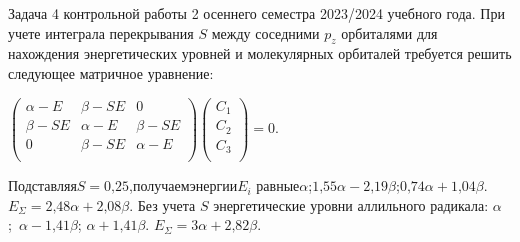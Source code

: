 \vspace{-\parskip}
\par
{} Задача 4 контрольной работы 2 осеннего семестра 2023/2024 учебного года. При учете интеграла перекрывания $S$ между соседними $p_z$ орбиталями для нахождения энергетических уровней и молекулярных орбиталей требуется решить следующее матричное уравнение:\par
\vspace{-\parskip}
\vspace{2mm}
\hspace{7mm}
$\begin{pmatrix}
\alpha-E & \beta-SE & 0 \\
\beta-SE & \alpha-E & \beta-SE \\
0 & \beta-SE & \alpha-E \\
\end{pmatrix}
\begin{pmatrix}
C_1 \\
C_2 \\
C_3 \\
\end{pmatrix}=0.$\par
\vspace{-\parskip}
\vspace{2mm}
Подставляя\hspace{\fill}$S=0\text{,}25$,\hspace{\fill}получаем\hspace{\fill}энергии\hspace{\fill}$E_i$ равные\hspace{\fill}$\alpha$;\hspace{\fill}$1\text{,}55\alpha-2\text{,}19\beta$;\hspace{\fill}$0\text{,}74\alpha+1\text{,}04\beta$.\\ $E_{\Sigma}=2\text{,}48\alpha+2\text{,}08\beta$. Без учета $S$ энергетические уровни аллильного радикала: $\alpha$;~$\alpha-1\text{,}41\beta$; $\alpha+1\text{,}41\beta$. $E_{\Sigma}=3\alpha+2\text{,}82\beta$.\par
